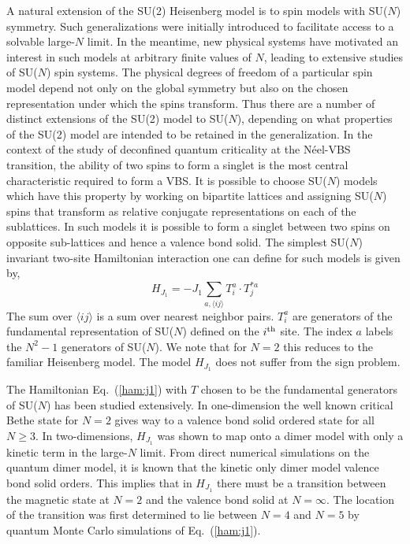 \documentclass[range]{ar2e}
\begin{document}
A natural extension of the SU(2) Heisenberg model is to spin models with
SU($N$) symmetry. Such generalizations were initially introduced to
facilitate access to
a solvable large-$N$ limit. In the meantime, new physical systems have
motivated an interest in such models at arbitrary finite values of
$N$, leading to extensive studies of SU($N$) spin systems. The physical degrees of freedom of a particular
spin model depend not only on the global symmetry but also on the
chosen representation under which the spins transform. Thus there are
a number of distinct extensions of the SU(2) model to SU($N$), depending on
what properties of the SU(2) model are intended to be retained in the
generalization. In the context of the study of deconfined quantum criticality at the
N\'eel-VBS transition, the ability of two spins to form a singlet is the most
central characteristic required to form a VBS. It
is possible to choose SU($N$) models which have this property by
working on bipartite lattices and
assigning SU($N$) spins that transform
as relative conjugate representations
 on each of the sublattices. In such models it is possible to form a singlet
between two spins on opposite sub-lattices and hence a valence bond
solid.  The simplest SU($N$) invariant two-site Hamiltonian interaction one can define for
such models is given by,
\begin{equation}
\label{ham:j1}
H_{J_1} = -J_1 \sum_{a,\langle ij\rangle} T^a_i\cdot T^{*a}_j
\end{equation}
The sum over $\langle ij \rangle$ is a sum over nearest neighbor
pairs. $T^a_i$ are generators of the fundamental representation of SU($N$) defined on the
$i^{\rm th}$ site. The index $a$ labels the $N^2-1$ generators of
SU($N$). We note that for $N=2$ this reduces to the familiar
Heisenberg model. The model $H_{J_1}$ does not suffer from the sign
problem.

The Hamiltonian Eq.~(\ref{ham:j1}) with $T$ chosen to be the
fundamental generators of SU($N$) has been studied extensively. In
one-dimension the well known critical Bethe state for $N=2$ gives way to a valence bond solid
ordered state for all $N\geq 3$.   In two-dimensions, $H_{J_1}$ was shown to map onto a dimer model
with only a kinetic term
in the large-$N$ limit. From direct numerical simulations
on the quantum dimer model, it is known that the kinetic only dimer model
valence bond solid orders.  This implies that in $H_{J_1}$ there must be a transition
between the magnetic state at $N=2$ and the valence bond solid at
$N=\infty$.  The location of the transition was first
determined to lie between $N=4$ and $N=5$ by quantum Monte Carlo
simulations of Eq.~(\ref{ham:j1}).
\end{document}
